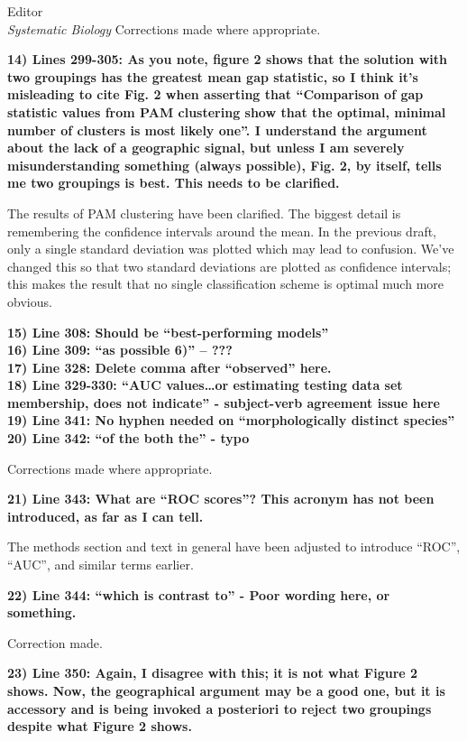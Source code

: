 \documentclass{letter}
\begin{document}
\begin{letter}{Editor \\ \textit{Systematic Biology}}
  Corrections made where appropriate.


  \textbf{14) Lines 299-305: As you note, figure 2 shows that the solution with two groupings has the greatest mean gap statistic, so I think it’s misleading to cite Fig. 2 when asserting that ``Comparison of gap statistic values from PAM clustering show that the optimal, minimal number of clusters is most likely one''. I understand the argument about the lack of a geographic signal, but unless I am severely misunderstanding something (always possible), Fig. 2, by itself, tells me two groupings is best. This needs to be clarified. }
  
  The results of PAM clustering have been clarified. The biggest detail is remembering the confidence intervals around the mean. In the previous draft, only a single standard deviation was plotted which may lead to confusion. We've changed this so that two standard deviations are plotted as confidence intervals; this makes the result that no single classification scheme is optimal much more obvious.
 

  \textbf{15) Line 308: Should be ``best-performing models''\\
    16) Line 309: ``as possible 6)'' -- ??? \\
    17) Line 328: Delete comma after ``observed'' here. \\
    18) Line 329-330: ``AUC values…or estimating testing data set membership, does not indicate'' - subject-verb agreement issue here \\
    19) Line 341: No hyphen needed on ``morphologically distinct species''\\
  20) Line 342: ``of the both the'' - typo }

  Corrections made where appropriate.


  \textbf{21) Line 343: What are ``ROC scores''? This acronym has not been introduced, as far as I can tell. }

  The methods section and text in general have been adjusted to introduce ``ROC'', ``AUC'', and similar terms earlier.

  \textbf{22) Line 344: ``which is contrast to'' - Poor wording here, or something. }

  Correction made.

  \textbf{23) Line 350: Again, I disagree with this; it is not what Figure 2 shows. Now, the geographical argument may be a good one, but it is accessory and is being invoked a posteriori to reject two groupings despite what Figure 2 shows. }


\end{letter}
\end{document}
